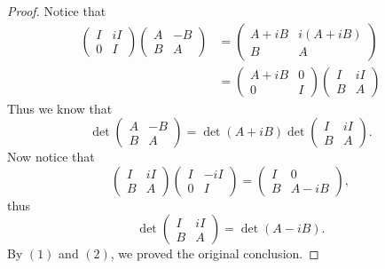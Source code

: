 \begin{proof}
	Notice that
	\begin{align*}
		\begin{pmatrix}I & iI \\0 & I\end{pmatrix}
		\begin{pmatrix}A & -B \\B & A\end{pmatrix}&=
		\begin{pmatrix}A+iB & i(A+iB) \\B & A\end{pmatrix}\\&=
		\begin{pmatrix}A+iB & 0 \\0 & I\end{pmatrix}
		\begin{pmatrix}I & iI \\B & A\end{pmatrix}
	\end{align*}
	Thus we know that
	\[\det \begin{pmatrix}A & -B \\B & A\end{pmatrix}=\det(A+iB) 
	\det \begin{pmatrix}I & iI \\B & A\end{pmatrix}.\tag{1}\]
	Now notice that
	\[\begin{pmatrix}I & iI \\B & A\end{pmatrix}
	\begin{pmatrix}I & -iI \\0 & I\end{pmatrix}=
	\begin{pmatrix}I & 0 \\B & A-iB\end{pmatrix},\]
	thus
	\[\det \begin{pmatrix}I & iI \\B & A\end{pmatrix}=\det(A-iB).\tag{2}\]
	By $(1)$ and $(2)$, we proved the original conclusion.
\end{proof}


